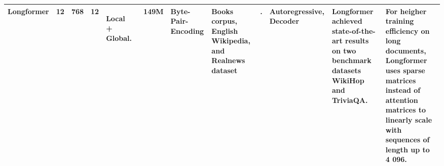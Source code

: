 \documentclass{article}
\begin{document}
\begin{center}
\begin{landscape}
\begin{longtable}{ | p{1.3cm} | p{0.3cm} | p{0.7cm} | p{0.3cm}| p{0.8cm} | p{0.8cm} |p{1.6cm} | p{2.5cm} | p{1.9cm} | p{1.9cm} | p{2.8cm} | p{3cm}|}
    \\
    
    Longformer      
    & 12
    & 768
    & 12
    & \begin{center}Local + Global.\end{center}
    & ~149M
    & Byte-Pair-Encoding
    & Books corpus, English Wikipedia, and Realnews dataset \cite{zellers2019defending}
    & .
    & Autoregressive, Decoder
    & Longformer achieved state-of-the-art results on two benchmark datasets WikiHop and TriviaQA.
    & For heigher training efficiency on long documents, Longformer uses sparse matrices instead of attention matrices to linearly scale with sequences of length up to 4 096.
    
    \\
    
    \hline
\end{longtable}
\end{landscape}
\end{center}





\small
  
\end{document}
